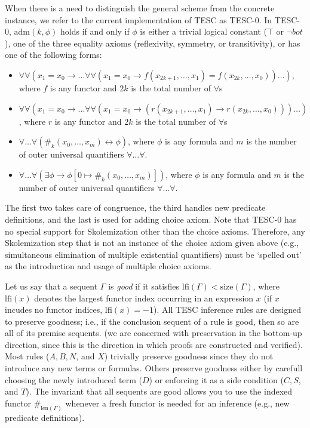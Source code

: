 \documentclass[12pt]{article}
\newcommand{\Len}[0]{\mathrm{len}}
\newcommand{\idf}[1]{\#_{#1}}
\newcommand{\limp}[0]{\to}
\newcommand{\liff}[0]{\leftrightarrow}
\newcommand{\lfi}[0]{\mathrm{lfi}}
\newcommand{\size}[0]{\mathrm{size}}
\begin{document}
When there is a need to distinguish the general scheme from the concrete instance, we refer to
the current implementation of TESC as TESC-0. In TESC-0, $\mathrm{adm}(k, \phi)$ holds if and only if 
$\phi$ is either a trivial logical constant ($\top$ or $\lnot bot$), one of the three equality axioms 
(reflexivity, symmetry, or transitivity), or has one of the following forms:
\begin{itemize}
    \item $\forall \forall (x_1 = x_0 \to \ldots \forall \forall (x_1 = x_0 \to f(x_{2k+1},\ldots,x_1) = f(x_{2k},\ldots,x_0))\ldots)$, 
      where $f$ is any functor and $2k$ is the total number of $\forall$s
    \item $\forall \forall (x_1 = x_0 \to \ldots \forall \forall (x_1 = x_0 \to (r(x_{2k+1},\ldots,x_1) \to r(x_{2k},\ldots,x_0)))\ldots)$,  
      where $r$ is any functor and $2k$ is the total number of $\forall$s
    \item $\forall \ldots \forall (\idf{k}(x_0, \ldots, x_m) \liff \phi)$, 
      where $\phi$ is any formula and $m$ is the number of outer universal quantifiers $\forall \ldots \forall$.
    \item $\forall \ldots \forall (\exists \phi \limp \phi[0 \mapsto \idf{k}(x_0, \ldots, x_m)])$, 
      where $\phi$ is any formula and $m$ is the number of outer universal quantifiers $\forall \ldots \forall$.
\end{itemize}
The first two takes care of congruence, the third handles new predicate definitions, and the last is
used for adding choice axiom. Note that TESC-0 has no special support for Skolemization other 
than the choice axioms. Therefore, any Skolemization step that is not an instance of the choice axiom 
given above (e.g., simultaneous elimination of multiple existential quantifiers) must be `spelled out' 
as the introduction and usage of multiple choice axioms.

Let us say that a sequent $\Gamma$ is \textit{good} if it satisfies $\lfi(\Gamma) < \size(\Gamma)$,
where $\lfi(x)$ denotes the largest functor index occurring in an expression $x$ (if $x$ incudes no 
functor indices, $\lfi(x) = -1$). All TESC inference rules are designed to preserve goodness; i.e.,
if the conclusion sequent of a rule is good, then so are all of its premise sequents. (we are concerned 
with preservation in the bottom-up direction, since this is the direction in which proofs are constructed 
and verified). Most rules ($A, B, N$, and $X$) trivially preserve goodness since they do not introduce 
any new terms or formulas. Others preserve goodness either by carefull choosing the newly introduced term
($D$) or enforcing it as a side condition ($C, S$, and $T$). The invariant that all sequents are good 
allows you to use the indexed functor $\idf{\Len(\Gamma)}$ whenever a fresh functor is needed for an 
inference (e.g., new predicate definitions).
\end{document}
